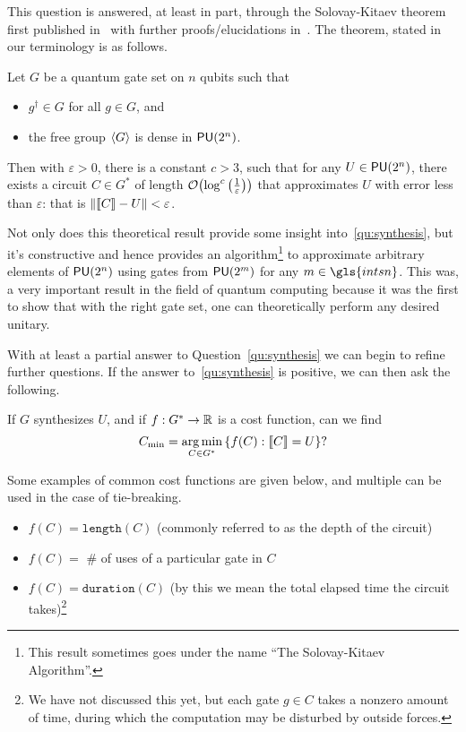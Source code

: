 This question is answered, at least in part, through the Solovay-Kitaev theorem first published in~\cite{bigkitaev} with further proofs/elucidations in~\cite{nielsenchuang,solovay-kitaev,kitaev-book}.
The theorem, stated in our terminology is as follows.
\begin{theorem}\label{thm:solovaykitaev}
    Let $G$ be a quantum gate set on $n$ qubits such that
    \begin{itemize}
        \item $g^\dagger \in G$ for all $g \in G$, and
        \item the free group $\expval{G}$ is dense in $\mathsf{PU} (2^n)$.
    \end{itemize}
    Then with $\varepsilon > 0$, there is a constant $c > 3$, such that for any $U \in \mathsf{PU} (2^n)$, there exists a circuit $C \in G^*$ of length $\order{\log^c\qty(\frac{1}{\varepsilon})}$ that approximates $U$ with error less than $\varepsilon$: that is $\norm{\llbracket C\rrbracket - U} < \varepsilon$.
\end{theorem}
Not only does this theoretical result provide some insight into~\ref{qu:synthesis}, but it's constructive and hence provides an algorithm\footnote{This result sometimes goes under the name ``The Solovay-Kitaev Algorithm''.} to approximate arbitrary elements of $\mathsf{PU} (2^n)$ using gates from $\mathsf{PU} (2^m)$ for any $m \in \gls{intsn}$.
This was, a very important result in the field of quantum computing because it was the first to show that with the right gate set, one can theoretically perform any desired unitary.

With at least a partial answer to Question~\ref{qu:synthesis} we can begin to refine further questions.
If the answer to~\ref{qu:synthesis} is positive, we can then ask the following.
\begin{question}\label{qu:optimalsynthesis}
    If $G$ synthesizes $U$, and if $f: G^* \to \mathbb{R}$ is a cost function, can we find
    \begin{equation*}
        C_\text{min} = \operatorname*{arg\,min}_{C\in G^*} \qty{f(C) : \llbracket C\rrbracket = U}?
    \end{equation*}
\end{question}
Some examples of common cost functions are given below, and multiple can be used in the case of tie-breaking.
\begin{itemize}
    \item $f(C) = \mathtt{length}(C)$ (commonly referred to as the depth of the circuit)
    \item $f(C) = $ \# of uses of a particular gate in $C$
    \item $f(C) = \mathtt{duration}(C)$ (by this we mean the total elapsed time the circuit takes)\footnote{We have not discussed this yet, but each gate $g\in C$ takes a nonzero amount of time, during which the computation may be disturbed by outside forces.}
\end{itemize}

